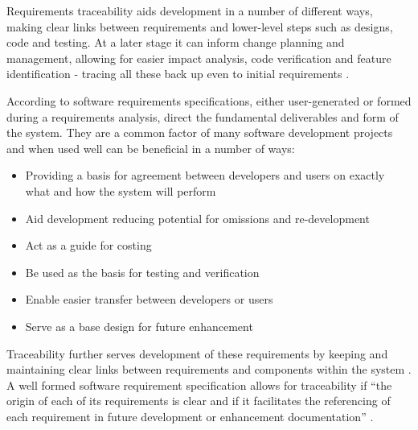 Requirements traceability aids development in a number of different ways, making clear links between requirements and lower-level steps such as designs, code and testing. At a later stage it can inform change planning and management, allowing for easier impact analysis, code verification and feature identification - tracing all these back up even to initial requirements \citep{cleland2012software}.

According to \citet{ieee1983srs} software requirements specifications, either user-generated or formed during a requirements analysis, direct the fundamental deliverables and form of the system. They are a common factor of many software development projects and when used well can be beneficial in a number of ways:
\begin{itemize}
\item Providing a basis for agreement between developers and users on exactly what and how the system will perform
\item Aid development reducing potential for omissions and re-development
\item Act as a guide for costing
\item Be used as the basis for testing and verification
\item Enable easier transfer between developers or users
\item Serve as a base design for future enhancement
\end{itemize}
\citep{ieee1983srs}
\newline

Traceability further serves development of these requirements by keeping and maintaining clear links between requirements and components within the system \citep{cleland2012software}. A well formed software requirement specification allows for traceability if ``the origin of each of its requirements is clear and if it facilitates the referencing of each requirement in future development or enhancement documentation'' \citep{ieee1983srs}.